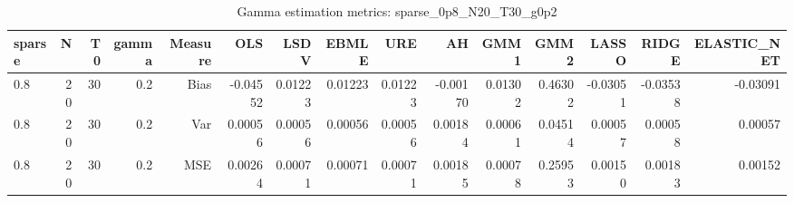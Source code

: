 \begin{table}[!htbp]\centering
\caption{Gamma estimation metrics: sparse_0p8_N20_T30_g0p2}
\label{tab:table1_sparse_0p8_N20_T30_g0p2}
\begin{tabular}{lrrrrrrrrrrrrrr}
\hline
sparse & N & T0 & gamma & Measure & OLS & LSDV & EBMLE & URE & AH & GMM1 & GMM2 & LASSO & RIDGE & ELASTIC_NET \\
\hline
0.8 & 20 & 30 & 0.2 & Bias & -0.04552 & 0.01223 & 0.01223 & 0.01223 & -0.00170 & 0.01302 & 0.46302 & -0.03051 & -0.03538 & -0.03091 \\
0.8 & 20 & 30 & 0.2 & Var & 0.00056 & 0.00056 & 0.00056 & 0.00056 & 0.00184 & 0.00061 & 0.04514 & 0.00057 & 0.00058 & 0.00057 \\
0.8 & 20 & 30 & 0.2 & MSE & 0.00264 & 0.00071 & 0.00071 & 0.00071 & 0.00185 & 0.00078 & 0.25953 & 0.00150 & 0.00183 & 0.00152 \\
\hline
\end{tabular}
\end{table}

